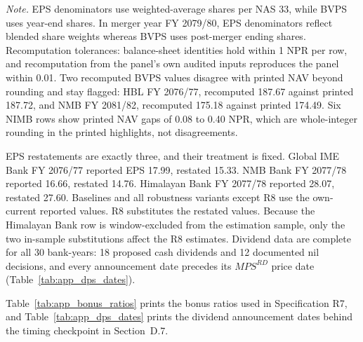 \vspace{4pt}
{\footnotesize\noindent
\textit{Note.} EPS denominators use weighted-average shares per NAS 33, while BVPS uses year-end shares. In merger year FY 2079/80, EPS denominators reflect blended share weights whereas BVPS uses post-merger ending shares. Recomputation tolerances: balance-sheet identities hold within 1 NPR per row, and recomputation from the panel's own audited inputs reproduces the panel within 0.01. Two recomputed BVPS values disagree with printed NAV beyond rounding and stay flagged: HBL FY 2076/77, recomputed 187.67 against printed 187.72, and NMB FY 2081/82, recomputed 175.18 against printed 174.49. Six NIMB rows show printed NAV gaps of 0.08 to 0.40 NPR, which are whole-integer rounding in the printed highlights, not disagreements.
\par}

EPS restatements are exactly three, and their treatment is fixed. Global IME Bank FY 2076/77 reported EPS 17.99, restated 15.33. NMB Bank FY 2077/78 reported 16.66, restated 14.76. Himalayan Bank FY 2077/78 reported 28.07, restated 27.60. Baselines and all robustness variants except R8 use the own-current reported values. R8 substitutes the restated values. Because the Himalayan Bank row is window-excluded from the estimation sample, only the two in-sample substitutions affect the R8 estimates. Dividend data are complete for all 30 bank-years: 18 proposed cash dividends and 12 documented nil decisions, and every announcement date precedes its $\mathit{MPS}^{RD}$ price date (Table~\ref{tab:app_dps_dates}).

Table~\ref{tab:app_bonus_ratios} prints the bonus ratios used in Specification R7, and Table~\ref{tab:app_dps_dates} prints the dividend announcement dates behind the timing checkpoint in Section~D.7.

